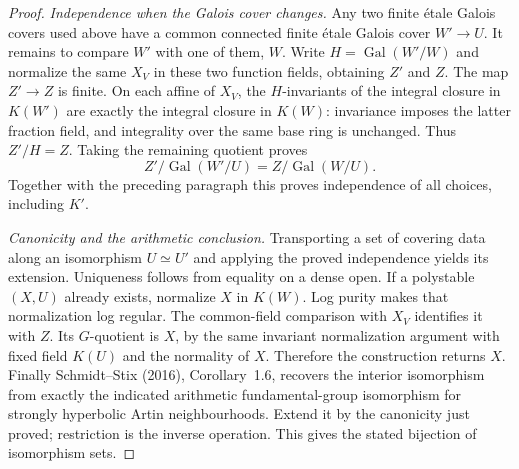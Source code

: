 \begin{proof}
\emph{Independence when the Galois cover changes.}
Any two finite \'etale Galois covers used above have a common
connected finite \'etale Galois cover $W'\to U$. It remains
to compare $W'$ with one of them, $W$. Write
$H=\operatorname{Gal}(W'/W)$ and normalize the same $X_V$
in these two function fields, obtaining $Z'$ and $Z$.
The map $Z'\to Z$ is finite. On each affine of $X_V$, the
$H$-invariants of the integral closure in $K(W')$ are
exactly the integral closure in $K(W)$: invariance imposes
the latter fraction field, and integrality over the same
base ring is unchanged. Thus $Z'/H=Z$. Taking the remaining
quotient proves
\[
 Z'/\operatorname{Gal}(W'/U)
   = Z/\operatorname{Gal}(W/U).
\]
Together with the preceding paragraph this proves independence
of all choices, including $K'$.

\emph{Canonicity and the arithmetic conclusion.}
Transporting a set of covering data along an isomorphism
$U\simeq U'$ and applying the proved independence yields its
extension. Uniqueness follows from equality on a dense open.
If a polystable $(X,U)$ already exists, normalize $X$ in
$K(W)$. Log purity makes that normalization log regular.
The common-field comparison with $X_V$ identifies it with
$Z$. Its $G$-quotient is $X$, by the same invariant
normalization argument with fixed field $K(U)$ and the
normality of $X$. Therefore the construction returns $X$.
Finally Schmidt--Stix (2016), Corollary~1.6, recovers the
interior isomorphism from exactly the indicated arithmetic
fundamental-group isomorphism for strongly hyperbolic Artin
neighbourhoods. Extend it by the canonicity just proved;
restriction is the inverse operation. This gives the stated
bijection of isomorphism sets.\qedhere
\end{proof}

